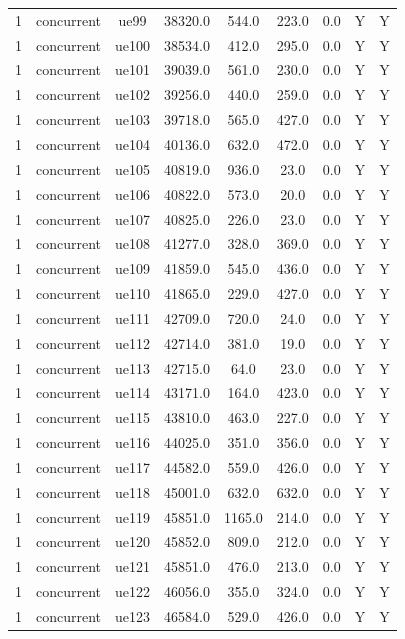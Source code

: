\begin{table}[ht]
\begin{tabular}{|c|c|c|c|c|c|c|c|c|}
1 & concurrent & ue99 & 38320.0 & 544.0 & 223.0 & 0.0 & Y & Y \\
1 & concurrent & ue100 & 38534.0 & 412.0 & 295.0 & 0.0 & Y & Y \\
1 & concurrent & ue101 & 39039.0 & 561.0 & 230.0 & 0.0 & Y & Y \\
1 & concurrent & ue102 & 39256.0 & 440.0 & 259.0 & 0.0 & Y & Y \\
1 & concurrent & ue103 & 39718.0 & 565.0 & 427.0 & 0.0 & Y & Y \\
1 & concurrent & ue104 & 40136.0 & 632.0 & 472.0 & 0.0 & Y & Y \\
1 & concurrent & ue105 & 40819.0 & 936.0 & 23.0 & 0.0 & Y & Y \\
1 & concurrent & ue106 & 40822.0 & 573.0 & 20.0 & 0.0 & Y & Y \\
1 & concurrent & ue107 & 40825.0 & 226.0 & 23.0 & 0.0 & Y & Y \\
1 & concurrent & ue108 & 41277.0 & 328.0 & 369.0 & 0.0 & Y & Y \\
1 & concurrent & ue109 & 41859.0 & 545.0 & 436.0 & 0.0 & Y & Y \\
1 & concurrent & ue110 & 41865.0 & 229.0 & 427.0 & 0.0 & Y & Y \\
1 & concurrent & ue111 & 42709.0 & 720.0 & 24.0 & 0.0 & Y & Y \\
1 & concurrent & ue112 & 42714.0 & 381.0 & 19.0 & 0.0 & Y & Y \\
1 & concurrent & ue113 & 42715.0 & 64.0 & 23.0 & 0.0 & Y & Y \\
1 & concurrent & ue114 & 43171.0 & 164.0 & 423.0 & 0.0 & Y & Y \\
1 & concurrent & ue115 & 43810.0 & 463.0 & 227.0 & 0.0 & Y & Y \\
1 & concurrent & ue116 & 44025.0 & 351.0 & 356.0 & 0.0 & Y & Y \\
1 & concurrent & ue117 & 44582.0 & 559.0 & 426.0 & 0.0 & Y & Y \\
1 & concurrent & ue118 & 45001.0 & 632.0 & 632.0 & 0.0 & Y & Y \\
1 & concurrent & ue119 & 45851.0 & 1165.0 & 214.0 & 0.0 & Y & Y \\
1 & concurrent & ue120 & 45852.0 & 809.0 & 212.0 & 0.0 & Y & Y \\
1 & concurrent & ue121 & 45851.0 & 476.0 & 213.0 & 0.0 & Y & Y \\
1 & concurrent & ue122 & 46056.0 & 355.0 & 324.0 & 0.0 & Y & Y \\
1 & concurrent & ue123 & 46584.0 & 529.0 & 426.0 & 0.0 & Y & Y \\

\end{tabular}
\end{table}
